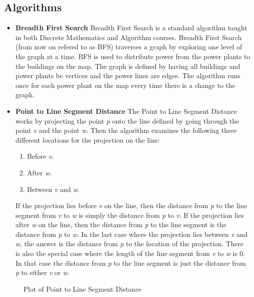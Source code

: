 	\subsection*{Algorithms}
		\begin{itemize}
			\item{\bf Breadth First Search}
			Breadth First Search is a standard algorithm taught in both Discrete Mathematics and 
			Algorithm courses. Breadth First Search (from now on refered to as BFS) traverses a graph 
			by exploring one level of the graph at a time. BFS is used to distribute power from the 
			power plants to the buildings on the map. The graph is defined by having all buildings 
			and power plants be vertices and the power lines are edges. The algorithm runs once for 
			each power plant on the map every time there is a change to the graph.

			\item {\bf Point to Line Segment Distance}
			The Point to Line Segment Distance works by projecting the point \emph{p} onto the line 
			defined by going through the point \emph{v} and the point \emph{w}. Then the algorithm 
			examines the following three different locations for the projection on the line: 
			\begin{enumerate}
				\item Before \emph{v}.
				\item After \emph{w}.
				\item Between \emph{v} and \emph{w}.
			\end{enumerate}
			If the projection lies before \emph{v} on the line, then the distance from \emph{p} to 
			the line segment from \emph{v} to \emph{w} is simply the distance from \emph{p} to 
			\emph{v}. If the projection lies after \emph{w} on the line, then the distance from 
			\emph{p} to the line segment is the distance from \emph{p} to \emph{w}. In the last case 
			where the projection lies between \emph{v} and \emph{w}, the answer is the distance from 
			\emph{p} to the location of the projection. There is also the special case where the 
			length of the line segment from \emph{v} to \emph{w} is 0. In that case the distance 
			from \emph{p} to the line segment is just the distance from \emph{p} to either \emph{v} 
			or \emph{w}.
		\end{itemize}

			\begin{figure}[H]
			\centering
			\caption{Plot of Point to Line Segment Distance}
			\end{figure}

